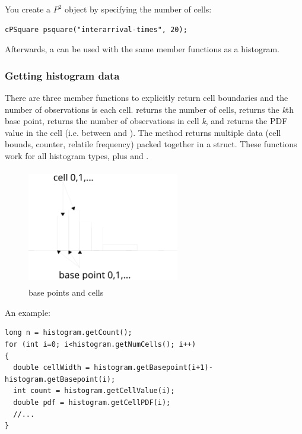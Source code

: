 You create a $P^{2}$ object by specifying the number of cells:

\begin{verbatim}
cPSquare psquare("interarrival-times", 20);
\end{verbatim}

Afterwards, a  can be used with the same member functions
as a histogram.


\subsubsection{Getting histogram data}


There are three member functions to explicitly return cell boundaries
and the number of observations is each cell.  returns
the number of cells,  returns the
\textit{k}th base point,  returns the
number of observations in cell \textit{k}, and
 returns the PDF value in the cell
(i.e. between  and
).
The  method returns multiple data
(cell bounds, counter, relatile frequency) packed together in a struct.
These functions work for all histogram types, plus 
and .

\begin{figure}[htbp]
  \begin{center}
    \includegraphics[width=2.615in, height=2.001in]{figures/histogramcells}
    \caption{base points and cells}
  \end{center}
\end{figure}

An example:

\begin{verbatim}
long n = histogram.getCount();
for (int i=0; i<histogram.getNumCells(); i++)
{
  double cellWidth = histogram.getBasepoint(i+1)-histogram.getBasepoint(i);
  int count = histogram.getCellValue(i);
  double pdf = histogram.getCellPDF(i);
  //...
}
\end{verbatim}


